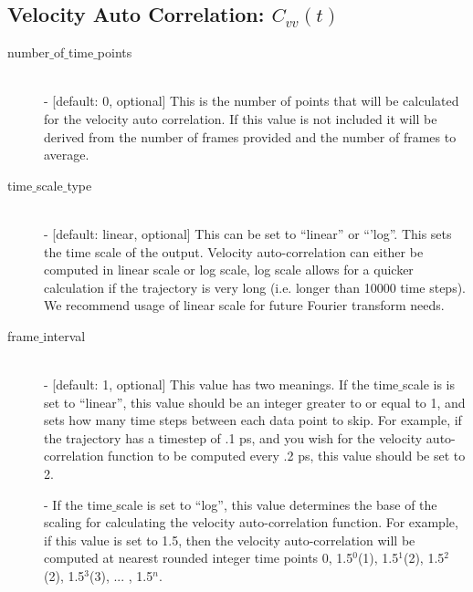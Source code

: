 \documentclass{article}
\begin{document}
\subsection{Velocity Auto Correlation: $C_{vv}(t)$} \label{sec::VACF_parm}
\begin{description}	
	\item[number$\_$of$\_$time$\_$points]\hfill \\
	- [default: 0, optional] This is the number of points that will be calculated for the velocity auto correlation.  If this value is not included it will be derived from the number of frames provided and the number of frames to average.
	
	\item[time$\_$scale$\_$type] \hfill \\
	- [default: linear, optional] This can be set to ``linear'' or ``'log''.  This sets the time scale of the output. Velocity auto-correlation can either be computed in linear scale or log scale, log scale allows for a quicker calculation if the trajectory is very long (i.e. longer than 10000 time steps). We recommend usage of linear scale for future Fourier transform needs.
	
	\item[frame$\_$interval] \hfill \\
	- [default: 1, optional] This value has two meanings.  If the time$\_$scale is is set to ``linear'', this value should be an integer greater to or equal to 1, and sets how many time steps between each data point to skip.  For example, if the trajectory has a timestep of .1 ps, and you wish for the velocity auto-correlation function to be computed every .2 ps, this value should be set to 2. 
	
	- If the time$\_$scale is set to ``log'', this value determines the base of the scaling for calculating the velocity auto-correlation function.  For example, if this value is set to 1.5, then the velocity auto-correlation will be computed at nearest rounded integer time points 0, 1.5$^0$(1), 1.5$^1$(2), 1.5$^2$(2), 1.5$^3$(3), ... , 1.5$^{n}$.
	
\end{description}
\end{document}
